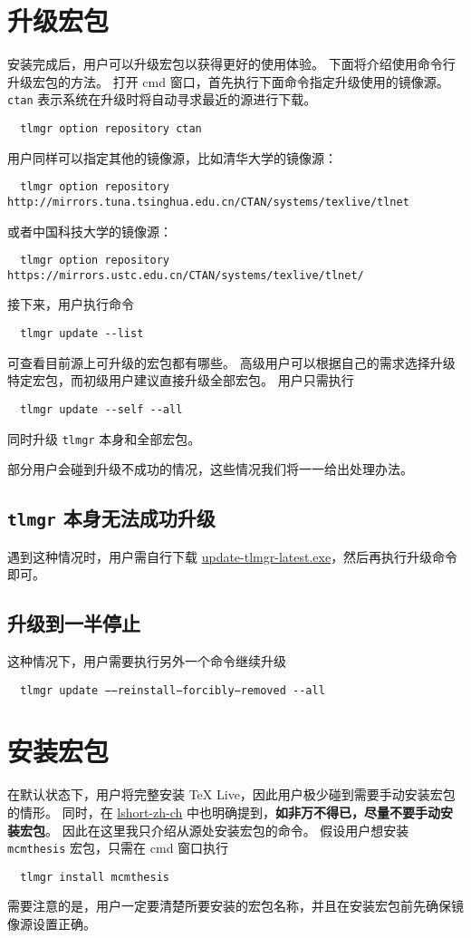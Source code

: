 \documentclass{ctexart}
\begin{document}
\section{升级宏包}
安装完成后，用户可以升级宏包以获得更好的使用体验。
下面将介绍使用命令行升级宏包的方法。
打开 \textsf{cmd} 窗口，首先执行下面命令指定升级使用的镜像源。
\texttt{ctan} 表示系统在升级时将自动寻求最近的源进行下载。
\begin{lstlisting}
  tlmgr option repository ctan
\end{lstlisting}
用户同样可以指定其他的镜像源，比如清华大学的镜像源：
\begin{lstlisting}
  tlmgr option repository http://mirrors.tuna.tsinghua.edu.cn/CTAN/systems/texlive/tlnet
\end{lstlisting}
或者中国科技大学的镜像源：
\begin{lstlisting}
  tlmgr option repository https://mirrors.ustc.edu.cn/CTAN/systems/texlive/tlnet/
\end{lstlisting}
接下来，用户执行命令
\begin{lstlisting}
  tlmgr update --list
\end{lstlisting}
可查看目前源上可升级的宏包都有哪些。
高级用户可以根据自己的需求选择升级特定宏包，而初级用户建议直接升级全部宏包。
用户只需执行
\begin{lstlisting}
  tlmgr update --self --all
\end{lstlisting}
同时升级 \texttt{tlmgr} 本身和全部宏包。

部分用户会碰到升级不成功的情况，这些情况我们将一一给出处理办法。

\subsection{\texttt{tlmgr} 本身无法成功升级}

遇到这种情况时，用户需自行下载 \href{http://mirror.ctan.org/systems/texlive/tlnet/update-tlmgr-latest.exe}{update-tlmgr-latest.exe}，然后再执行升级命令即可。

\subsection{升级到一半停止}

这种情况下，用户需要执行另外一个命令继续升级
\begin{lstlisting}
  tlmgr update −−reinstall−forcibly−removed --all
\end{lstlisting}

\section{安装宏包}
在默认状态下，用户将完整安装 \TeX{} Live，因此用户极少碰到需要手动安装宏包的情形。
同时，在 \href{http://mirrors.ctan.org/info/lshort/chinese/lshort-zh-cn.pdf}{lshort-zh-ch} 中也明确提到，\textbf{如非万不得已，尽量不要手动安装宏包}。
因此在这里我只介绍从源处安装宏包的命令。
假设用户想安装 \texttt{mcmthesis} 宏包，只需在 \textsf{cmd} 窗口执行
\begin{lstlisting}
  tlmgr install mcmthesis
\end{lstlisting}
需要注意的是，用户一定要清楚所要安装的宏包名称，并且在安装宏包前先确保镜像源设置正确。
\end{document}
